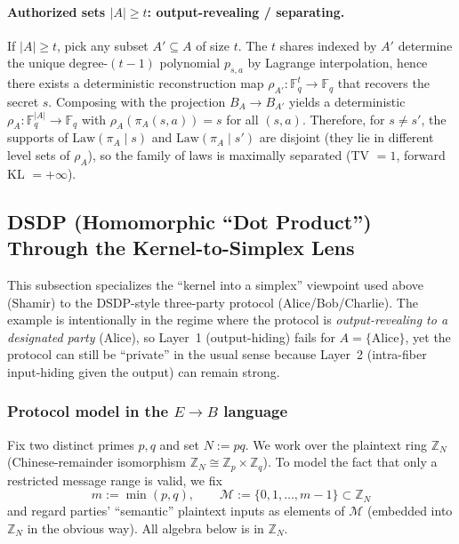 \documentclass[11pt,a4paper]{article}
\theoremstyle{definition}
\theoremstyle{plain}
\newcommand{\Z}{\mathbb{Z}}
\newcommand{\F}{\mathbb{F}}
\begin{document}
\paragraph{Authorized sets $|A|\ge t$: output-revealing / separating.}
If $|A|\ge t$, pick any subset $A'\subseteq A$ of size $t$.
The $t$ shares indexed by $A'$ determine the unique degree-$(t-1)$ polynomial $p_{s,a}$ by Lagrange interpolation, hence there exists a deterministic reconstruction map $\rho_{A'}:\F_q^{t}\to\F_q$ that recovers the secret $s$.
Composing with the projection $B_A\to B_{A'}$ yields a deterministic $\rho_A:\F_q^{|A|}\to\F_q$ with $\rho_A(\pi_A(s,a))=s$ for all $(s,a)$.
Therefore, for $s\neq s'$, the supports of $\mathrm{Law}(\pi_A\mid s)$ and $\mathrm{Law}(\pi_A\mid s')$ are disjoint (they lie in different level sets of $\rho_A$), so the family of laws is maximally separated (TV $=1$, forward KL $=+\infty$).

\subsection{DSDP (Homomorphic ``Dot Product'') Through the Kernel-to-Simplex Lens}
\label{subsec:protocol-dsdp}
This subsection specializes the ``kernel into a simplex'' viewpoint used above (Shamir) to the DSDP-style three-party protocol (Alice/Bob/Charlie).
The example is intentionally in the regime where the protocol is \emph{output-revealing to a designated party} (Alice), so Layer~1 (output-hiding) fails for $A=\{\mathrm{Alice}\}$, yet the protocol can still be ``private'' in the usual sense because Layer~2 (intra-fiber input-hiding given the output) can remain strong.

\subsubsection{Protocol model in the $E\to B$ language}
Fix two distinct primes $p,q$ and set $N:=pq$.
We work over the plaintext ring $\Z_N$ (Chinese-remainder isomorphism $\Z_N\cong \Z_p\times \Z_q$).
To model the fact that only a restricted message range is valid, we fix
\[
m:=\min(p,q),\qquad \mathcal{M}:=\{0,1,\dots,m-1\}\subset \Z_N
\]
and regard parties' ``semantic'' plaintext inputs as elements of $\mathcal{M}$ (embedded into $\Z_N$ in the obvious way).
All algebra below is in $\Z_N$.
\end{document}
